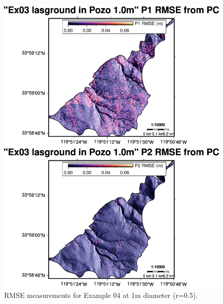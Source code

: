 \documentclass[a4paperpaper,,tablecaptionabove]{scrartcl}
\begin{document}
\begin{figure}
\centering
\includegraphics[width=\textwidth,height=0.9\textheight]{./tex2pdf.-e6884bf2dada0f3b/eb7bf76ff384440df3cf014b2d6e3b703ff28d16.png}
\caption{RMSE measurements for Example 04 at 1m diameter
(r=0.5).\label{Fig:Ex04_cl2_1.0m_2panel_RMSE}}
\end{figure}
\end{document}
